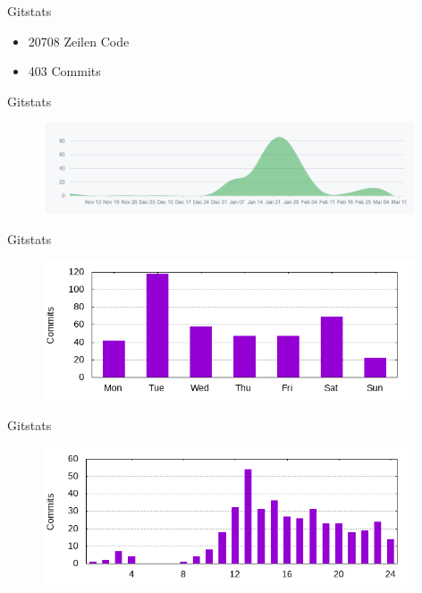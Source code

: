 \documentclass[11pt, usepdftitle=false,...]{beamer}
\begin{document}
	\begin{frame}{Gitstats}
	    \begin{itemize}
	        \item 20708 Zeilen Code
	        \item 403 Commits
	    \end{itemize}
	\end{frame}
	
	\begin{frame}{Gitstats}
	    \begin{figure}[ht] 
					\centering
					\includegraphics[width=11cm]{images/PSE_Commits.PNG}
					\label{Commits}
				\end{figure}
	\end{frame}
	
	\begin{frame}{Gitstats}
	    \begin{figure}[ht] 
					\centering
					\includegraphics[width=11cm]{images/day_of_week.png}
					\label{Commits}
				\end{figure}
	\end{frame}
	
	\begin{frame}{Gitstats}
	    \begin{figure}[ht] 
					\centering
					\includegraphics[width=11cm]{images/hour_of_day.png}
					\label{Commits}
				\end{figure}
	\end{frame}
	
\end{document}
